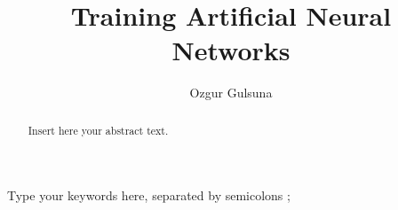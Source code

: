 \documentclass[3p,times,procedia]{elsarticle}
\begin{document}
\begin{frontmatter}





\title{Training Artificial Neural Networks}




\author[]{Ozgur Gulsuna} 

\address[]{Middle East Technical University, Electrical and Electronics Engineering, Ankara, Turkey}

\begin{abstract}
Insert here your abstract text.
\end{abstract}

\begin{keyword}
Type your keywords here, separated by semicolons ; 



\end{keyword}
\end{frontmatter}
\end{document}
